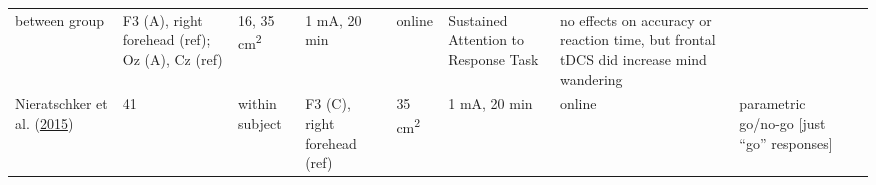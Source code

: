 \documentclass[11pt,]{memoir}
\begin{document}
\begin{longtable}[]{@{}lllllllll@{}}
\begin{minipage}[t]{0.04\columnwidth}
between
group\strut
\end{minipage} & \begin{minipage}[t]{0.10\columnwidth}\raggedright
F3 (A), right
forehead (ref); Oz
(A), Cz (ref)\strut
\end{minipage} & \begin{minipage}[t]{0.03\columnwidth}\raggedright
16,
35
cm\textsuperscript{2}\strut
\end{minipage} & \begin{minipage}[t]{0.05\columnwidth}\raggedright
1 mA, 20
min\strut
\end{minipage} & \begin{minipage}[t]{0.06\columnwidth}\raggedright
online\strut
\end{minipage} & \begin{minipage}[t]{0.12\columnwidth}\raggedright
Sustained Attention to
Response Task\strut
\end{minipage} & \begin{minipage}[t]{0.25\columnwidth}\raggedright
no effects on accuracy or reaction time, but frontal
tDCS did increase mind wandering\strut
\end{minipage}\tabularnewline
\begin{minipage}[t]{0.09\columnwidth}\raggedright
Nieratschker et al. (\protect\hyperlink{ref-Nieratschker2015}{2015})\strut
\end{minipage} & \begin{minipage}[t]{0.02\columnwidth}\raggedright
41\strut
\end{minipage} & \begin{minipage}[t]{0.04\columnwidth}\raggedright
within
subject\strut
\end{minipage} & \begin{minipage}[t]{0.10\columnwidth}\raggedright
F3 (C), right
forehead (ref)\strut
\end{minipage} & \begin{minipage}[t]{0.03\columnwidth}\raggedright
35
cm\textsuperscript{2}\strut
\end{minipage} & \begin{minipage}[t]{0.05\columnwidth}\raggedright
1 mA, 20
min\strut
\end{minipage} & \begin{minipage}[t]{0.06\columnwidth}\raggedright
online\strut
\end{minipage} & \begin{minipage}[t]{0.12\columnwidth}\raggedright
parametric go/no-go {[}just
``go'' responses{]}\strut

\end{minipage}
\end{longtable}
\end{document}
